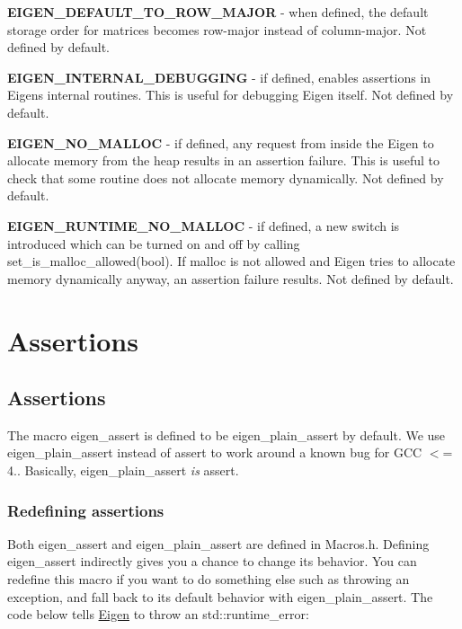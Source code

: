 \begin{DoxyItemize}
\item {\bfseries E\+I\+G\+E\+N\+\_\+\+D\+E\+F\+A\+U\+L\+T\+\_\+\+T\+O\+\_\+\+R\+O\+W\+\_\+\+M\+A\+J\+OR} -\/ when defined, the default storage order for matrices becomes row-\/major instead of column-\/major. Not defined by default.
\item {\bfseries E\+I\+G\+E\+N\+\_\+\+I\+N\+T\+E\+R\+N\+A\+L\+\_\+\+D\+E\+B\+U\+G\+G\+I\+NG} -\/ if defined, enables assertions in Eigen\textquotesingle{}s internal routines. This is useful for debugging Eigen itself. Not defined by default.
\item {\bfseries E\+I\+G\+E\+N\+\_\+\+N\+O\+\_\+\+M\+A\+L\+L\+OC} -\/ if defined, any request from inside the Eigen to allocate memory from the heap results in an assertion failure. This is useful to check that some routine does not allocate memory dynamically. Not defined by default.
\item {\bfseries E\+I\+G\+E\+N\+\_\+\+R\+U\+N\+T\+I\+M\+E\+\_\+\+N\+O\+\_\+\+M\+A\+L\+L\+OC} -\/ if defined, a new switch is introduced which can be turned on and off by calling {\ttfamily set\+\_\+is\+\_\+malloc\+\_\+allowed(bool)}. If malloc is not allowed and Eigen tries to allocate memory dynamically anyway, an assertion failure results. Not defined by default. 
\end{DoxyItemize}\hypertarget{TopicAssertions}{}\section{Assertions}\label{TopicAssertions}
\hypertarget{_topic_assertions_PlainAssert}{}\subsection{Assertions}\label{_topic_assertions_PlainAssert}
The macro eigen\+\_\+assert is defined to be {\ttfamily eigen\+\_\+plain\+\_\+assert} by default. We use eigen\+\_\+plain\+\_\+assert instead of {\ttfamily assert} to work around a known bug for G\+CC $<$= 4.. Basically, eigen\+\_\+plain\+\_\+assert {\itshape is} {\ttfamily assert}.\hypertarget{_topic_assertions_RedefineAssert}{}\subsubsection{Redefining assertions}\label{_topic_assertions_RedefineAssert}
Both eigen\+\_\+assert and eigen\+\_\+plain\+\_\+assert are defined in Macros.\+h. Defining eigen\+\_\+assert indirectly gives you a chance to change its behavior. You can redefine this macro if you want to do something else such as throwing an exception, and fall back to its default behavior with eigen\+\_\+plain\+\_\+assert. The code below tells \hyperlink{namespace_eigen}{Eigen} to throw an std\+::runtime\+\_\+error\+:


